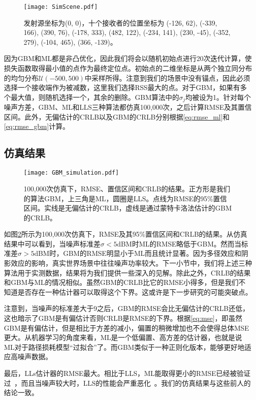 \begin{figure}[tb]
	\centering
	\texttt{[image: SimScene.pdf]}
	\caption{发射源坐标为(0, 0)，十个接收者的位置坐标为 (-126, 62), (-339, 166), (390, 76), (-178, 333), (482, 122), (-234, 141), (230, -45), (-352, 279), (-104, 465), (366, -139)。}
	\label{fig:simscene}
\end{figure}

因为GBM和ML都是非凸优化，因此我们将会以随机初始点进行20次迭代计算，使损失函数取得最小值的点作为最终定位点。初始点的二维坐标是从两个独立同分布的均匀分布$\mathcal{U}(-500, 500)$中采样所得。注意到我们的场景中没有锚点，因此必须选择一个接收端作为被减数，这里我们选择RSS最大的点。对于GBM，如果有多个最大值，则随机选择一个，其余的删除。GBM算法中的$\sigma_j$均被设为1。针对每个噪声方差，GBM、ML和LLS三种算法都仿真100,000次，之后计算RMSE及其置信区间。此外，无偏估计的CRLB以及GBM的CRLB分别根据\eqref{eq:rmse_ml}和\eqref{eq:rmse_gbm}计算。

\subsection{仿真结果}

\begin{figure}[tb]
	\centering
	\texttt{[image: GBM\_simulation.pdf]}
	\caption{100,000次仿真下，RMSE、置信区间和CRLB的结果。正方形是我们的算法GBM，上三角是ML，圆圈是LLS。点线为RMSE的95\%置信区间。实线是无偏估计的CRLB，虚线是通过蒙特卡洛法估计的GBM的CRLB。}
	\label{fig:gbm_sim}
\end{figure}

如图\ref{fig:gbm_sim}所示为100,000次仿真下，RMSE及其95\%置信区间和CRLB的结果。从仿真结果中可以看到，当噪声标准差$\sigma<5$dBM时ML的RMSE略低于GBM。然而当标准差$\sigma>5$dBM时，GBM的RMSE明显小于ML而且统计显著。因为多径效应和阴影效应的影响，真实世界场景中往往噪声功率较大。下一小节中，我们将上述三种算法用于实测数据，结果将为我们提供一些深入的见解。除此之外，CRLB的结果和GBM与ML的情况相似。虽然GBM的CRLB比它的RMSE小得多，但是我们不知道是否存在一种估计器可以取得这个下界。这或许是下一步研究的可能突破点。

注意到，当噪声的标准差大于9之后，GBM的RMSE会比无偏估计的CRLB还低，这也暗示了GBM是有偏估计否则CRLB是RMSE的下界。根据\eqref{eq:mse}，即虽然GBM是有偏估计，但是相比于方差的减小，偏置的稍微增加也不会使得总体MSE更大。从机器学习的角度来看，ML是一个低偏置、高方差的估计器，也就是说ML对于路径损耗模型“过拟合”了。而GBM类似于一种正则化版本，能够更好地适应高噪声数据。

最后，LLs估计器的RMSE最大。相比于LLS，ML能取得更小的RMSE已经被验证过~\cite{jackson2011received}，而且当噪声较大时，LLS的性能会严重恶化~\cite{vaghefi2013cooperative}。我们的仿真结果与这些前人的结论一致。

